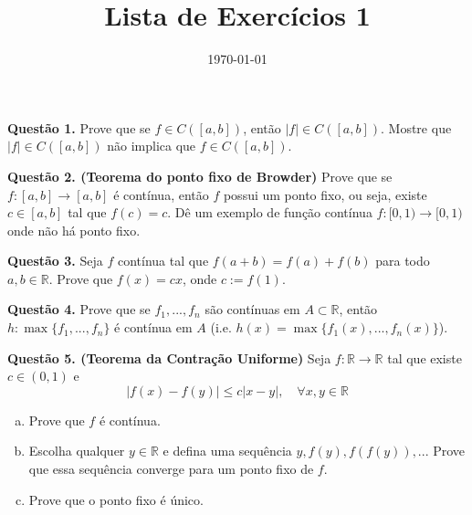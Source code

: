 \documentclass[10pt]{article}
\title{Lista de Exercícios 1}
\author{}
\date{\today}
\theoremstyle{definition}
\begin{document}
\maketitle

\noindent
\textbf{Questão 1.} Prove que se $f \in C([a,b])$, então $|f| \in C([a,b])$. Mostre que
$|f| \in C([a,b])$ não implica que $f \in C([a,b])$.
\vspace{5mm}

\noindent
\textbf{Questão 2. (Teorema do ponto fixo de Browder)} Prove que se
$f:[a,b]\to [a,b]$ é contínua, então $f$ possui um ponto fixo, ou seja, existe 
$c \in [a,b]$ tal que $f(c)=c$. Dê um exemplo de função contínua $f:[0,1)\to [0,1)$
onde não há ponto fixo.
\vspace{5mm}

\noindent
\textbf{Questão 3.} Seja $f$ contínua tal que $f(a+b)= f(a)+f(b)$ para todo
$a,b \in \mathbb R$. Prove que $f(x)=cx$, onde $c:=f(1)$.
\vspace{5mm}

\noindent
\textbf{Questão 4.} Prove que se $f_1,...,f_n$ são contínuas em $A \subset \mathbb R$,
então $h:\max\{f_1,...,f_n\}$ é contínua em $A$ (i.e. $h(x) = \max\{f_1(x),...,f_n(x)\}$).
\vspace{5mm}

\noindent
\textbf{Questão 5. (Teorema da Contração Uniforme)}
Seja $f:\mathbb R \to \mathbb R$ tal que existe $c \in (0,1)$ e
$$
|f(x) - f(y)| \leq c|x-y|, \quad \forall x,y \in \mathbb R
$$
\begin{enumerate}[(a)]
	\item Prove que $f$ é contínua.
	\item Escolha qualquer $y \in \mathbb R$ e defina uma sequência $y, f(y), f(f(y)),...$
	Prove que essa sequência converge para um ponto fixo de $f$.
	\item Prove que o ponto fixo é único.
\end{enumerate}


\nocite{*}

  
  
\end{document}
